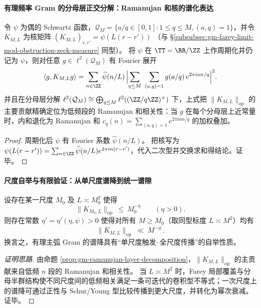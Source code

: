 \paragraph{有理频率 Gram 的分母层正交分解：Ramanujan 和核的谱化表达}
\begin{proposition}\label{prop:gm-ramanujan-layer-decomposition}
令 \(\psi\) 为偶的 Schwartz 函数，\(\mathcal{Q}_M=\{a/q\in[0,1]:1\le q\le M,(a,q)=1\}\)，并令
\(
K_{M,L}
\)
为核矩阵
\(
(K_{M,L})_{r,r'}=\psi(L(r-r'))
\)
（与 \S\ref{subsubsec:gm-farey-limit-mod-obstruction-zeck-measure} 同型）。
将 \(\psi\) 在 \(\TT=\RR/\ZZ\) 上作周期化并仍记为 \(\psi\)，则对任意 \(g\in\ell^2(\mathcal{Q}_M)\) 有 Fourier 展开
\[
\langle g,K_{M,L}g\rangle
=\sum_{n\in\ZZ}\widehat\psi(n/L)\,
\Bigl|\sum_{q\le M}\ \sum_{(a,q)=1} g(a/q)\,e^{2\pi i an/q}\Bigr|^2.
\]
并且在分母层分解 \(\ell^2(\mathcal{Q}_M)\cong\bigoplus_{q\le M}\ell^2((\ZZ/q\ZZ)^\times)\) 下，上式把 \(\|K_{M,L}\|_{\mathrm{op}}\) 的主要贡献精确定位为低频段的 Ramanujan 和相关性：当 \(g\) 在每个分母层上近常量时，内和退化为 Ramanujan 和
\(
c_q(n)=\sum_{(a,q)=1}e^{2\pi i an/q}
\)
的加权叠加。
\end{proposition}

\begin{proof}
周期化后 \(\psi\) 有 Fourier 系数 \(\widehat\psi(n/L)\)。
把核写为 \(\psi(L(r-r'))=\sum_{n\in\ZZ}\widehat\psi(n/L)e^{2\pi i n(r-r')}\)，代入二次型并交换求和得结论。证毕。
\end{proof}

\paragraph{尺度自举与有限验证：从单尺度谱降到统一谱隙}
\begin{proposition}\label{prop:gm-scale-bootstrap-gram}
设存在某一尺度 \(M_0\) 及 \(L\asymp M_0^2\) 使得
\[
\|K_{M_0,L}\|_{\mathrm{op}}\ \le\ M_0^{-\eta}
\qquad(\eta>0).
\]
则存在常数 \(\eta'=\eta'(\eta,\psi)>0\) 使得对所有 \(M\ge M_0\)（取同型标度 \(L\asymp M^2\)）均有
\[
\|K_{M,L}\|_{\mathrm{op}}\ \ll\ M^{-\eta'}.
\]
换言之，有理主弧 Gram 的谱降具有“单尺度触发--全尺度传播”的自举性质。
\end{proposition}

\begin{proof}[证明思路]
由命题 \ref{prop:gm-ramanujan-layer-decomposition}，\(\|K_{M,L}\|_{\mathrm{op}}\) 的主贡献来自低频 \(n\) 段的 Ramanujan 和相关性。
当 \(L\asymp M^2\) 时，Farey 局部覆盖与分母半群结构使不同尺度间的低频相关满足一条可迭代的卷积型不等式；一次尺度上的谱降可通过正性与 Schur/Young 型比较传播到更大尺度，并转化为幂次衰减。证毕。
\end{proof}

